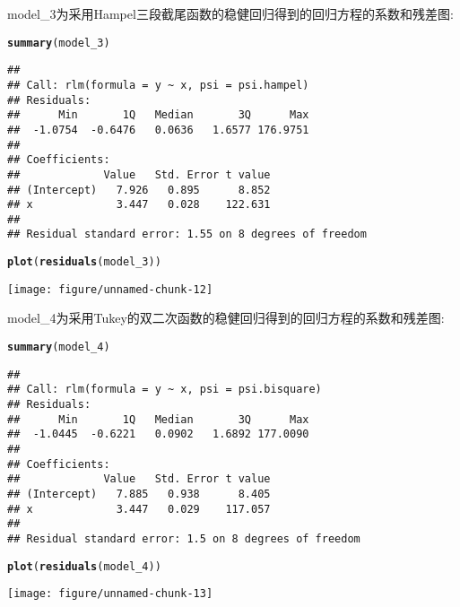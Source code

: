 \documentclass[english]{article}\usepackage[]{graphicx}\usepackage[]{color}
\makeatletter
\def\maxwidth{ %
  \ifdim\Gin@nat@width>\linewidth
    \linewidth
  \else
    \Gin@nat@width
  \fi
}
\newcommand{\hlkwd}[1]{\textcolor[rgb]{0.737,0.353,0.396}{\textbf{#1}}}%
\newenvironment{kframe}{%
 \def\at@end@of@kframe{}%
 \ifinner\ifhmode%
  \def\at@end@of@kframe{\end{minipage}}%
  \begin{minipage}{\columnwidth}%
 \fi\fi%
 \def\FrameCommand##1{\hskip\@totalleftmargin \hskip-\fboxsep
 \colorbox{shadecolor}{##1}\hskip-\fboxsep
     \hskip-\linewidth \hskip-\@totalleftmargin \hskip\columnwidth}%
 \MakeFramed {\advance\hsize-\width
   \@totalleftmargin\z@ \linewidth\hsize
   \@setminipage}}%
 {\par\unskip\endMakeFramed%
 \at@end@of@kframe}
\newenvironment{knitrout}{}{} %
\makeatother
\begin{document}
model\_3为采用Hampel三段截尾函数的稳健回归得到的回归方程的系数和残差图:

\begin{knitrout}
\color{fgcolor}\begin{kframe}
\begin{alltt}
\hlkwd{summary}(model_3)
\end{alltt}
\begin{verbatim}
## 
## Call: rlm(formula = y ~ x, psi = psi.hampel)
## Residuals:
##      Min       1Q   Median       3Q      Max 
##  -1.0754  -0.6476   0.0636   1.6577 176.9751 
## 
## Coefficients:
##             Value   Std. Error t value
## (Intercept)   7.926   0.895      8.852
## x             3.447   0.028    122.631
## 
## Residual standard error: 1.55 on 8 degrees of freedom
\end{verbatim}
\begin{alltt}
\hlkwd{plot}(\hlkwd{residuals}(model_3))
\end{alltt}
\end{kframe}
\texttt{[image: figure/unnamed-chunk-12]} 

\end{knitrout}


model\_4为采用Tukey的双二次函数的稳健回归得到的回归方程的系数和残差图:

\begin{knitrout}
\color{fgcolor}\begin{kframe}
\begin{alltt}
\hlkwd{summary}(model_4)
\end{alltt}
\begin{verbatim}
## 
## Call: rlm(formula = y ~ x, psi = psi.bisquare)
## Residuals:
##      Min       1Q   Median       3Q      Max 
##  -1.0445  -0.6221   0.0902   1.6892 177.0090 
## 
## Coefficients:
##             Value   Std. Error t value
## (Intercept)   7.885   0.938      8.405
## x             3.447   0.029    117.057
## 
## Residual standard error: 1.5 on 8 degrees of freedom
\end{verbatim}
\begin{alltt}
\hlkwd{plot}(\hlkwd{residuals}(model_4))
\end{alltt}
\end{kframe}
\texttt{[image: figure/unnamed-chunk-13]} 

\end{knitrout}
\end{document}
